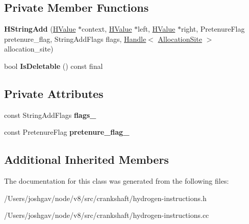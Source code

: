 \subsection*{Private Member Functions}
\begin{DoxyCompactItemize}
\item 
{\bfseries H\+String\+Add} (\hyperlink{classv8_1_1internal_1_1_h_value}{H\+Value} $\ast$context, \hyperlink{classv8_1_1internal_1_1_h_value}{H\+Value} $\ast$left, \hyperlink{classv8_1_1internal_1_1_h_value}{H\+Value} $\ast$right, Pretenure\+Flag pretenure\+\_\+flag, String\+Add\+Flags flags, \hyperlink{classv8_1_1internal_1_1_handle}{Handle}$<$ \hyperlink{classv8_1_1internal_1_1_allocation_site}{Allocation\+Site} $>$ allocation\+\_\+site)\hypertarget{classv8_1_1internal_1_1_h_string_add_a2c37d7418af6064bb5c72d944fcf5412}{}\label{classv8_1_1internal_1_1_h_string_add_a2c37d7418af6064bb5c72d944fcf5412}

\item 
bool {\bfseries Is\+Deletable} () const  final\hypertarget{classv8_1_1internal_1_1_h_string_add_ad5e36f136bb2eeac36389582ba2e0484}{}\label{classv8_1_1internal_1_1_h_string_add_ad5e36f136bb2eeac36389582ba2e0484}

\end{DoxyCompactItemize}
\subsection*{Private Attributes}
\begin{DoxyCompactItemize}
\item 
const String\+Add\+Flags {\bfseries flags\+\_\+}\hypertarget{classv8_1_1internal_1_1_h_string_add_afc4da7e657dcb4247c1ab601d619d577}{}\label{classv8_1_1internal_1_1_h_string_add_afc4da7e657dcb4247c1ab601d619d577}

\item 
const Pretenure\+Flag {\bfseries pretenure\+\_\+flag\+\_\+}\hypertarget{classv8_1_1internal_1_1_h_string_add_afe0d930c079d3e7af0655a79892cd467}{}\label{classv8_1_1internal_1_1_h_string_add_afe0d930c079d3e7af0655a79892cd467}

\end{DoxyCompactItemize}
\subsection*{Additional Inherited Members}


The documentation for this class was generated from the following files\+:\begin{DoxyCompactItemize}
\item 
/\+Users/joshgav/node/v8/src/crankshaft/hydrogen-\/instructions.\+h\item 
/\+Users/joshgav/node/v8/src/crankshaft/hydrogen-\/instructions.\+cc\end{DoxyCompactItemize}
